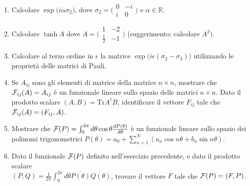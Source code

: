 \documentclass[a4paper,10pt]{article}
\begin{document}
\begin{enumerate}
\item Calcolare $\exp \Big( i \alpha \sigma_2 \Big)$, dove 
$\sigma_2=\bigl( \begin{smallmatrix} 0 & -i \\ i & 0 \end{smallmatrix} \bigr)$
e $\alpha \in \mathbb{R}$.
\item Calcolare $\tanh A$ dove $A=\bigl( \begin{smallmatrix} 1 & -2 \\ \frac{1}{2} & -1 \end{smallmatrix} \bigr)$ (suggerimento: calcolare $A^2$).
\item Calcolare al terzo ordine in $\epsilon$ la matrice $\exp \Big( i \epsilon (\sigma_2 - \sigma_3 ) \Big)$ utilizzando le propriet\`a delle matrici di Pauli.
\item Se $A_{ij}$ sono gli elementi di matrice della matrice $n\times n$, mostrare che ${\cal F}_{ij}(A)=A_{ij}$ \`e un funzionale lineare
sullo spazio delle matrici $n\times n$.
Dato il prodotto scalare 
$(A,B)=\text{Tr} A^\dag B$, identificare il vettore $F_{ij}$
tale che ${\cal F}_{ij}(A)=(F_{ij},A)$.
\item Mostrare che ${\cal F}(P) = \int_0^{2\pi} d\theta \cos \theta \frac{d P(\theta)}{d\theta}$
\`e un funzionale lineare sullo spazio dei polinomi trigonometrici 
$P(\theta)= a_0 + \sum_{n=1}^N (a_n \cos n\theta + b_n \sin n \theta)$.
\item Dato il funzionale ${\cal F}(P)$ definito nell'esercizio precedente, 
e dato il prodotto
scalare \\ $(P,Q)=\frac{1}{2\pi} \int_0^{2\pi} d\theta \overline{P(\theta)}
Q(\theta)$, trovare il vettore $F$ tale che ${\cal F}(P)=(F,P)$.
\end{enumerate}

\vskip10pt
\end{document}
